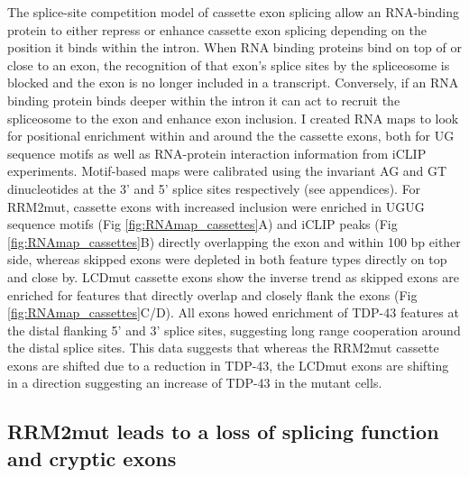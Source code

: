 The splice-site competition model of cassette exon splicing allow an RNA-binding protein to either repress or enhance cassette exon splicing depending on the position it binds within the intron. When RNA binding proteins bind on top of or close to an exon, the recognition of that exon's splice sites by the spliceosome is blocked and the exon is no longer included in a transcript. Conversely, if an RNA binding protein binds deeper within the intron it can act to recruit the spliceosome to the exon and enhance exon inclusion. 
I created RNA maps to look for positional enrichment within and around the the cassette exons, both for UG sequence motifs as well as RNA-protein interaction information from iCLIP experiments. 
Motif-based maps were calibrated using the invariant AG and GT dinucleotides at the 3' and 5' splice sites respectively (see appendices).
For RRM2mut, cassette exons with increased inclusion were enriched in UGUG sequence motifs (Fig \ref{fig:RNAmap_cassettes}A) and iCLIP peaks (Fig \ref{fig:RNAmap_cassettes}B) directly overlapping the exon and within 100 bp either side, whereas skipped exons were depleted in both feature types directly on top and close by. 
LCDmut cassette exons show the inverse trend as skipped exons are enriched for features that directly overlap and closely flank the exons (Fig \ref{fig:RNAmap_cassettes}C/D).
All exons howed enrichment of TDP-43 features at the distal flanking 5' and 3' splice sites, suggesting long range cooperation around the distal splice sites.
This data suggests that whereas the RRM2mut cassette exons are shifted due to a reduction in TDP-43, the LCDmut exons are shifting in a direction suggesting an increase of TDP-43 in the mutant cells.


\subsection{RRM2mut leads to a loss of splicing function and cryptic exons}

